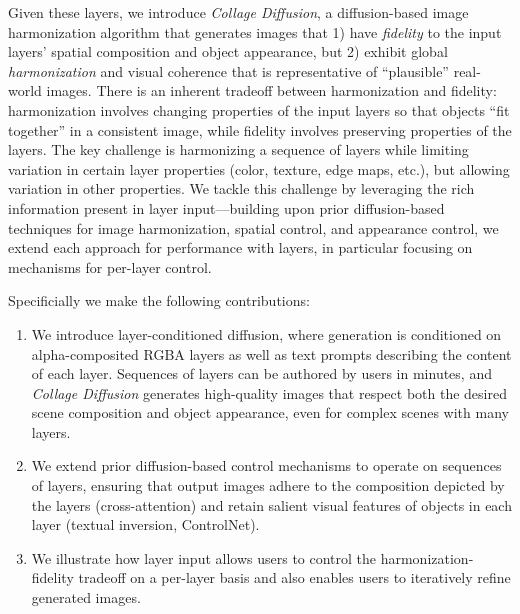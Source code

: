 Given these layers, we introduce \emph{Collage Diffusion}, a diffusion-based image harmonization algorithm that generates images that 1) have \emph{fidelity} to the input layers' spatial composition and object appearance, but 2) exhibit global \emph{harmonization} and visual coherence that is representative of ``plausible'' real-world images.  
There is an inherent tradeoff between harmonization and fidelity: harmonization involves changing properties of the input layers so that objects ``fit together'' in a consistent image, while fidelity involves preserving properties of the layers. 
The key challenge is harmonizing a sequence of layers while limiting variation in certain layer properties (color, texture, edge maps, etc.), but allowing variation in other properties. 
We tackle this challenge by leveraging the rich information present in layer input---building upon prior diffusion-based techniques for image harmonization, spatial control, and appearance control, we extend each approach for performance with layers, in particular focusing on mechanisms for per-layer control. 

Specificially we make the following contributions:

\begin{enumerate}%
	\item We introduce layer-conditioned diffusion, where generation is conditioned on alpha-composited RGBA layers as well as text prompts describing the content of each layer. Sequences of layers can be authored by users in minutes, and \textit{Collage Diffusion} generates high-quality images that respect both the desired scene composition and object appearance, even for complex scenes with many layers. 

	\item We extend prior diffusion-based control mechanisms \cite{ediffi,TextualInversion,zhang2023adding} to operate on sequences of layers, ensuring that output images adhere to the composition depicted by the layers (cross-attention) and retain salient visual features of objects in each layer (textual inversion, ControlNet). 

	\item 
	We illustrate how layer input allows users to control the harmonization-fidelity tradeoff on a per-layer basis and also enables users to iteratively refine generated images.
\end{enumerate}
\vspace{-0.5em}